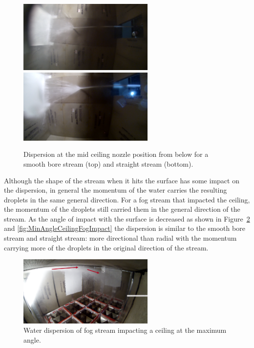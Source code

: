 \documentclass[12pt,oneside]{book}
\begin{document}
\begin{figure}[!ht]
\centering
\centering
\includegraphics[width=0.6\textwidth]{Figures/Water_Distribution/Nozzle_Directions/Exterior_MidCeiling_SB_FirstFloor_Under} \\
\includegraphics[width=0.6\textwidth]{Figures/Water_Distribution/Nozzle_Directions/Exterior_MidCeiling_SS_FirstFloor_Under}
\caption[Water Dispersion for Smooth Bore Stream and Straight Stream at Mid Ceiling]{Dispersion at the  mid ceiling nozzle position from below for a smooth bore stream (top) and straight stream (bottom).}
\label{fig:Mid_Ceiling_Dispersion}
\end{figure}

Although the shape of the stream when it hits the surface has some impact on the dispersion, in general the momentum of the water carries the resulting droplets in the same general direction. For a fog stream that impacted the ceiling, the momentum of the droplets still carried them in the general direction of the stream. As the angle of impact with the surface is decreased as shown in Figure~\ref{fig:MaxAngleCeilingFogImpact} and \ref{fig:MinAngleCeilingFogImpact} the dispersion is similar to the smooth bore stream and straight stream: more directional than radial with the momentum carrying more of the droplets in the original direction of the stream.

\begin{figure}[!ht]
\centering
\includegraphics[width=0.6\textwidth]{Figures/Water_Distribution/Nozzle_Directions/Interior_MaxAngleCeiling_Fog_Arrows}
\caption[Water Dispersion Fog Stream Maximum Angle Ceiling]{Water dispersion of fog stream impacting a ceiling at the maximum angle.}
\label{fig:MaxAngleCeilingFogImpact}
\end{figure}
\end{document}
